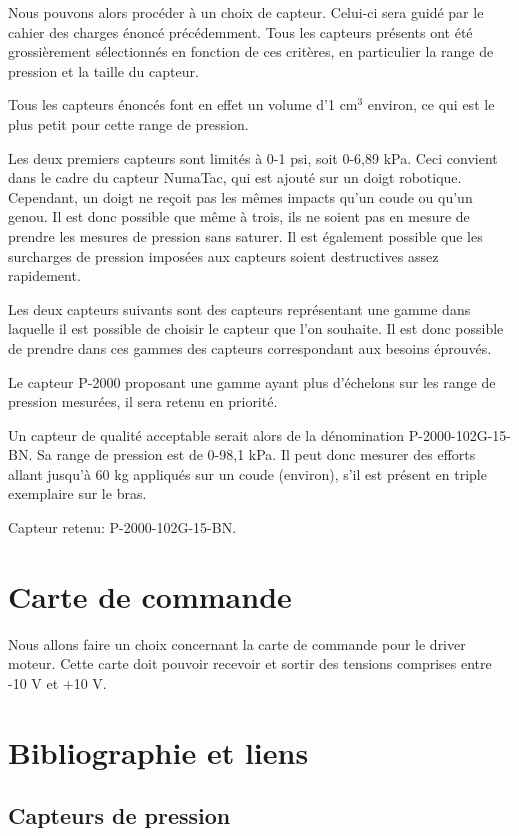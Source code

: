 \documentclass[11pt]{report}
\begin{document}
Nous pouvons alors procéder à un choix de capteur. Celui-ci sera guidé par le 
cahier des charges énoncé précédemment. Tous les capteurs présents ont été 
grossièrement sélectionnés en fonction de ces critères, en particulier la range 
de pression et la taille du capteur. 

Tous les capteurs énoncés font en effet un volume d'1 cm$^3$ environ, ce qui est 
le plus petit pour cette range de pression.

Les deux premiers capteurs sont limités à 0-1 psi, soit 0-6,89 kPa. Ceci 
convient dans le cadre du capteur NumaTac, qui est ajouté sur un doigt 
robotique. Cependant, un doigt ne reçoit pas les mêmes impacts qu'un coude ou 
qu'un genou. Il est donc possible que même à trois, ils ne soient pas en mesure 
de prendre les mesures de pression sans saturer. Il est également possible que 
les surcharges de pression imposées aux capteurs soient destructives assez 
rapidement.

Les deux capteurs suivants sont des capteurs représentant une gamme dans 
laquelle il est possible de choisir le capteur que l'on souhaite. Il est donc 
possible de prendre dans ces gammes des capteurs correspondant aux besoins 
éprouvés.

Le capteur P-2000 proposant une gamme ayant plus d'échelons sur les range de pression 
mesurées, il sera retenu en priorité.

Un capteur de qualité acceptable serait alors de la dénomination 
P-2000-102G-15-BN. Sa range de pression est de 0-98,1 kPa.
Il peut donc mesurer des efforts allant jusqu'à 60 kg appliqués sur un 
coude (environ), s'il est présent en triple exemplaire sur le bras. 

Capteur retenu: P-2000-102G-15-BN.




\section{Carte de commande}

Nous allons faire un choix concernant la carte de commande pour le driver 
moteur. Cette carte doit pouvoir recevoir et sortir des tensions comprises entre 
-10 V et +10 V. 


\section{Bibliographie et liens}

\subsection{Capteurs de pression}
\end{document}
